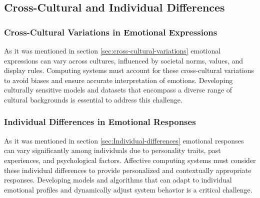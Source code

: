 \subsection{Cross-Cultural and Individual Differences}
\subsubsection{Cross-Cultural Variations in Emotional Expressions}
As it was mentioned in section \ref{sec:cross-cultural-variations} emotional expressions can vary across cultures, influenced by societal norms, values, and display rules.
Computing systems must account for these cross-cultural variations to avoid biases and ensure accurate interpretation of emotions. 
Developing culturally sensitive models and datasets that encompass a diverse range of cultural backgrounds is essential to address this challenge.
\subsubsection{Individual Differences in Emotional Responses}
As it was mentioned in section \ref{sec:Individual-differences} emotional responses can vary significantly among individuals due to personality traits, past experiences, 
and psychological factors. Affective computing systems must consider these individual differences to provide personalized and contextually appropriate responses.
 Developing models and algorithms that can adapt to individual emotional profiles and dynamically adjust system behavior is a critical challenge.